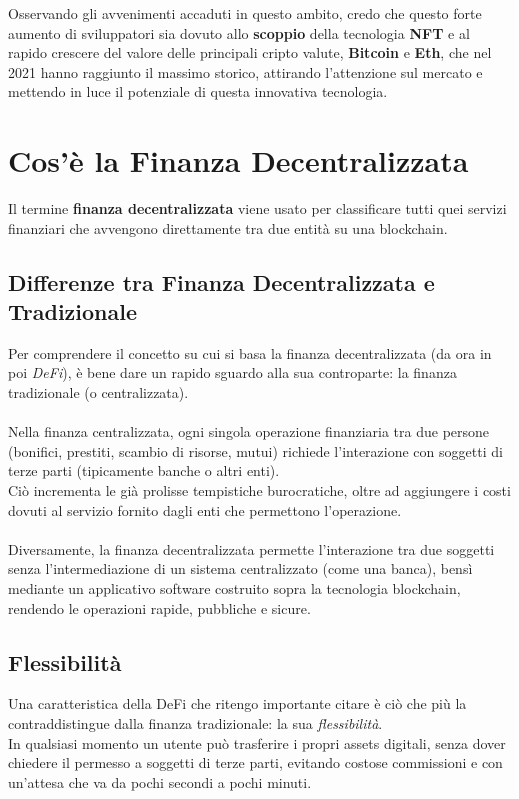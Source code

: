 \documentclass[12pt,a4paper]{report}
\begin{document}
\noindent Osservando gli avvenimenti accaduti in questo ambito, credo che questo forte aumento di sviluppatori sia dovuto allo \textbf{scoppio} della tecnologia \textbf{NFT} e al rapido crescere del valore delle principali cripto valute, \textbf{Bitcoin} e \textbf{Eth}, che nel 2021 hanno raggiunto il massimo storico, attirando l'attenzione sul mercato e mettendo in luce il potenziale di questa innovativa tecnologia.

\section{Cos'è la Finanza Decentralizzata}

Il termine \textbf{finanza decentralizzata} viene usato per classificare tutti quei servizi finanziari che avvengono direttamente tra due entità su una blockchain.

\subsection{Differenze tra Finanza Decentralizzata e Tradizionale}

Per comprendere il concetto su cui si basa la finanza decentralizzata (da ora in poi \textit{DeFi}), è bene dare un rapido sguardo alla sua controparte: la finanza tradizionale (o centralizzata).\\\\
Nella finanza centralizzata, ogni singola operazione finanziaria tra due persone (bonifici, prestiti, scambio di risorse, mutui) richiede l'interazione con soggetti di terze parti (tipicamente banche o altri enti).\\
Ciò incrementa le già prolisse tempistiche burocratiche, oltre ad aggiungere i costi dovuti al servizio fornito dagli enti che permettono l'operazione.
\\\\Diversamente, la finanza decentralizzata permette l'interazione tra due soggetti senza l'intermediazione di un sistema centralizzato (come una banca), bensì mediante un applicativo software costruito sopra la tecnologia blockchain, rendendo le operazioni rapide, pubbliche e sicure.

\subsection{Flessibilità}

Una caratteristica della DeFi che ritengo importante citare è ciò che più la contraddistingue dalla finanza tradizionale: la sua \textit{flessibilità}.\\
In qualsiasi momento un utente può trasferire i propri assets digitali, senza dover chiedere il permesso a soggetti di terze parti, evitando costose commissioni e con un'attesa che va da pochi secondi a pochi minuti. 
\end{document}
